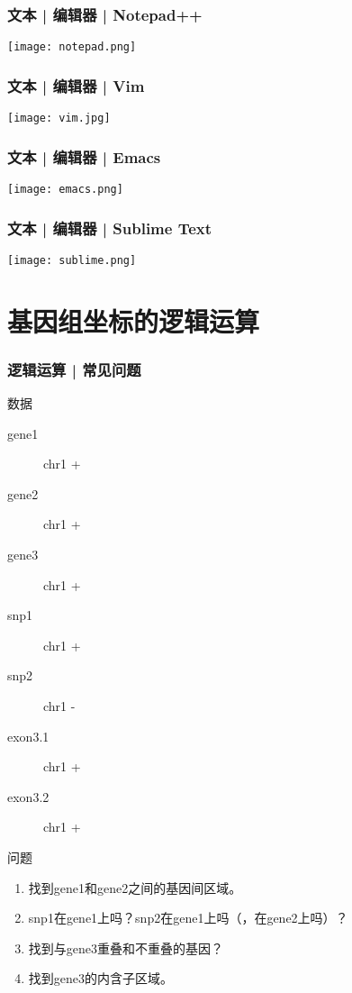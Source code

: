 \begin{frame}
  \frametitle{文本 | 编辑器 | Notepad++}
    \begin{center}
      \texttt{[image: notepad.png]}
    \end{center}
\end{frame}

\begin{frame}
  \frametitle{文本 | 编辑器 | Vim}
    \begin{center}
      \texttt{[image: vim.jpg]}
    \end{center}
\end{frame}

\begin{frame}
  \frametitle{文本 | 编辑器 | Emacs}
    \begin{center}
      \texttt{[image: emacs.png]}
    \end{center}
\end{frame}

\begin{frame}
  \frametitle{文本 | 编辑器 | Sublime Text}
    \begin{center}
      \texttt{[image: sublime.png]}
    \end{center}
\end{frame}

\section{基因组坐标的逻辑运算}
\begin{frame}
  \frametitle{逻辑运算 | 常见问题}
  \begin{block}{数据}
    \begin{description}
      \item[gene1] chr1   \quad +
      \item[gene2] chr1   \quad +
      \item[gene3] chr1   \quad +
      \item[snp1] chr1  \quad +
      \item[snp2] chr1  \quad -
      \item[exon3.1] chr1   \quad +
      \item[exon3.2] chr1   \quad +
    \end{description}
  \end{block}
  \pause
  \begin{block}{问题}
    \begin{enumerate}
      \item 找到gene1和gene2之间的基因间区域。
      \item snp1在gene1上吗？snp2在gene1上吗（，在gene2上吗）？
      \item 找到与gene3重叠和不重叠的基因？
      \item 找到gene3的内含子区域。
    \end{enumerate}
  \end{block}
\end{frame}


